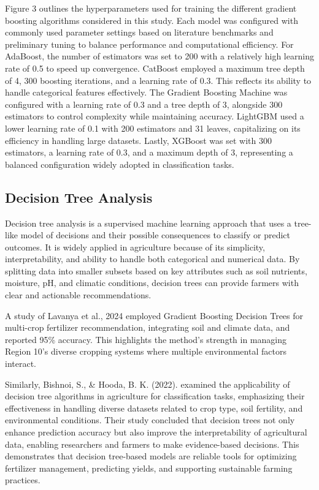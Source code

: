 {Figure 3 outlines the hyperparameters used for training the different gradient boosting algorithms considered in this study. Each model was configured with commonly used parameter settings based on literature benchmarks and preliminary tuning to balance performance and computational efficiency. For AdaBoost, the number of estimators was set to 200 with a relatively high learning rate of 0.5 to speed up convergence. CatBoost employed a maximum tree depth of 4, 300 boosting iterations, and a learning rate of 0.3. This reflects its ability to handle categorical features effectively. The Gradient Boosting Machine was configured with a learning rate of 0.3 and a tree depth of 3, alongside 300 estimators to control complexity while maintaining accuracy. LightGBM used a lower learning rate of 0.1 with 200 estimators and 31 leaves, capitalizing on its efficiency in handling large datasets. Lastly, XGBoost was set with 300 estimators, a learning rate of 0.3, and a maximum depth of 3, representing a balanced configuration widely adopted in classification tasks. 

\subsection{Decision Tree Analysis}
Decision tree analysis is a supervised machine learning approach that uses a tree-like model of decisions and their possible consequences to classify or predict outcomes. It is widely applied in agriculture because of its simplicity, interpretability, and ability to handle both categorical and numerical data. By splitting data into smaller subsets based on key attributes such as soil nutrients, moisture, pH, and climatic conditions, decision trees can provide farmers with clear and actionable recommendations.

A study of Lavanya et al., 2024 employed Gradient Boosting Decision Trees for multi-crop fertilizer recommendation, integrating soil and climate data, and reported 95\% accuracy. This highlights the method’s strength in managing Region 10’s diverse cropping systems where multiple environmental factors interact.

Similarly, Bishnoi, S., \& Hooda, B. K. (2022).  examined the applicability of decision tree algorithms in agriculture for classification tasks, emphasizing their effectiveness in handling diverse datasets related to crop type, soil fertility, and environmental conditions. Their study concluded that decision trees not only enhance prediction accuracy but also improve the interpretability of agricultural data, enabling researchers and farmers to make evidence-based decisions. This demonstrates that decision tree-based models are reliable tools for optimizing fertilizer management, predicting yields, and supporting sustainable farming practices.

}

